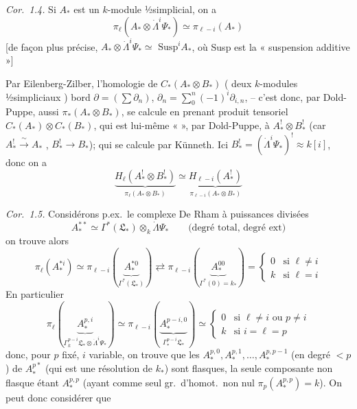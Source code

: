 \documentclass[11pt,a4paper]{article}
\begin{document}
\emph{Cor.\ 1.4.} Si $A_*$ est un $k$-module ½simplicial, on a
\[ \pi_\ell(A_* \otimes \dot\Lambda^i\Psi_*) \simeq \pi_{\ell-i}(A_*) \]
[de façon plus précise,  $A_* \otimes \dot\Lambda^i\Psi_* \simeq$  $\mathrm{Susp}^iA_*$,
où Susp est la « suspension additive »]

Par Eilenberg-Zilber, l'\struck{\ill{}}homologie de
$C_*(A_* \otimes B_*)$ ( deux $k$-modules ½simpliciaux \struck{\ill{}})
  bord $\partial = (\sum\partial_n)$, $\partial_n = \sum_0^n (-1)^i\partial_{i,n}$, --
c'est donc, par Dold-Puppe, aussi $\pi_*(A_* \otimes B_*)$,
se calcule en prenant   produit tensoriel
 $C_*(A_*) \otimes C_*(B_*)$, qui est
lui-même «  », par Dold-Puppe,
à \struck{\ill{}} $A^!_* \otimes B^!_*$ (car $A^!_* \xrightarrow{\ \sim\ } A_*$ ,
$B^!_* \to B_*$);   qui se calcule par
Künneth. Ici $B^!_* = (\dot\Lambda^i\Psi_*)^! \approx k[i]$, donc
on  a
\[ \underbrace{H_\ell(A^!_* \otimes B^!_*)}_{\pi_\ell(A_* \otimes B_*)} \simeq \underbrace{H_{\ell-i}(A^!_*)}_{\pi_{\ell-i}(A_* \otimes B_*)} \]

\emph{Cor.\ 1.5.}
Considérons p.ex.\ le complexe   De Rham
à puissances divisées
\[ A^{**}_* \simeq \Gamma^*(\mathfrak{L}_*) \otimes_k \dot\Lambda\Psi_* \qquad \text{(degré total, degré ext)} \]
on trouve alors
\[ \pi_\ell(A^{*i}_*) \simeq \pi_{\ell-i}(\underbrace{A^{*0}_*}_{\Gamma^*(\mathfrak{L}_*)}) \rightleftarrows \pi_{\ell-i}(\underbrace{A^{00}_*}_{\Gamma^*(0) = k_*}) = \begin{cases} 0 & \text{si } \ell \neq i \\ k & \text{si } \ell = i \end{cases} \]
En particulier \struck{\ill{}}
\[ \pi_\ell(\underbrace{A^{p,i}_*}_{\Gamma^{p-i}_k\mathfrak{L}_* \otimes \dot\Lambda^i\Psi_*}) \simeq \pi_{\ell-i}(\underbrace{A^{p-i,0}_*}_{\Gamma^{p-i}_*\mathfrak{L}_*}) \simeq \begin{cases} 0 & \text{si } \ell \neq i \text{ ou } p \neq i \\ k & \text{si } i = \ell = p \end{cases} \]
donc, pour $p$ fixé, $i$ variable, on trouve que les
 
$A^{p,0}_*, A^{p,1}_*, \dots, A^{p,p-1}_*$ (en degré $< p$) de $A^{p*}_*$
(qui est une résolution de $k_*$) sont
flasques, la seule composante non flasque étant
$A^{p,p}_*$ (ayant comme seul gr.\ d'homot.\ non nul
$\pi_p(A^{p,p}_*) = k$). On peut donc considérer que
\end{document}
